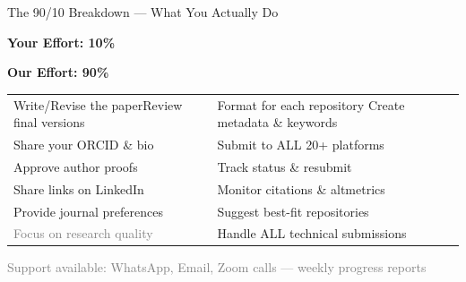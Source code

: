 \documentclass[10pt, aspectratio=169]{beamer}
\begin{document}
	\begin{frame}{The 90/10 Breakdown — What You Actually Do}
		\begin{center}
			\Large{\textcolor{myblue}{\textbf{Your Effort: 10\%}}}
			
			\vspace{0.1cm}
			\Large{\textcolor{myorange}{\textbf{Our Effort: 90\%}}}
		\end{center}
		
		\vspace{0.3cm}
		\begin{table}
			\centering
			\begin{tabular}{>{\centering\arraybackslash}p{4.5cm} >{\centering\arraybackslash}p{4.5cm}}
				\toprule
				\multicolumn{1}{c}{\textbf{\textcolor{myorange}{You (10\%)}}} & \multicolumn{1}{c}{\textbf{\textcolor{myblue}{We (90\%)}}} \\
				\midrule
				Write/Revise the paperReview final versions & Format for each repository Create metadata \& keywords  \\
		
				Share your ORCID \& bio & Submit to ALL 20+ platforms \\
				Approve author proofs & Track status \& resubmit   \\
				Share links on LinkedIn & Monitor citations \& altmetrics \\
				Provide journal preferences & Suggest best-fit repositories \\
				\textcolor{gray}{Focus on research quality} & Handle ALL technical submissions \\
				\bottomrule
			\end{tabular}
		\end{table}
		

		\begin{center}
			
			\vspace{0.2cm}
			\tiny{\textcolor{gray}{Support available: WhatsApp, Email, Zoom calls — weekly progress reports}}
		\end{center}
	\end{frame}
	
\end{document}
